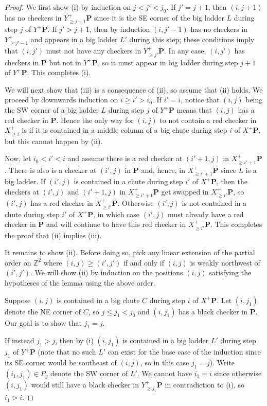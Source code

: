 \documentclass[11pt,reqno]{amsart} %
\newcommand{\bbZ}{\mathbb{Z}}
\newcommand{\bfP}{\mathbf{P}}
\theoremstyle{definition}
\begin{document}
\begin{proof}
We first show (i) by induction on $j< j'< j_0$.
If $j' = j+1$, then $(i,j+1)$ has no checkers in $Y^+_{\geq j+1} \bfP$ since it is the SE corner of the big ladder $L$ during step $j$ of $Y^+\bfP$.
If $j' > j+1$, then by induction $(i,j'-1)$ has no checkers in $Y^+_{\geq j'-1}$ and appears in a big ladder $L'$ during this step; these conditions imply that $(i,j')$ must not have any checkers in $Y^+_{\geq j'}\bfP$.
In any case, $(i,j')$ has checkers in $\bfP$ but not in $Y^+\bfP$, so it must appear in big ladder during step $j+1$ of $Y^+\bfP$.
This completes (i).

We will next show that (iii) is a consequence of (ii), so assume that (ii) holds.
We proceed by downwards induction on $i\geq i'> i_0$.
If $i' = i$, notice that $(i,j)$ being the SW corner of a big ladder $L$ during step $j$ of $Y^+\bfP$ means that $(i,j)$ has a red checker in $\bfP$.
Hence the only way for $(i,j)$ to not contain a red checker in $X^+_{\geq i}$ is if it is contained in a middle column of a big chute during step $i$ of $X^+\bfP$, but this cannot happen by (ii).

Now, let $i_0<i'<i$ and assume there is a red checker at $(i'+1,j)$ in $X^+_{\geq i'+1}\bfP$.
There is also is a checker at $(i',j)$ in $\bfP$ and, hence, in $X^+_{\geq i'+1}\bfP$ since $L$ is a big ladder.
If $(i',j)$ is contained in a chute during step $i'$ of $X^+\bfP$, then the checkers at $(i',j)$ and $(i'+1,j)$ in $X^+_{\geq i'+1}\bfP$ get swapped in $X^+_{\geq i'}\bfP$, so $(i',j)$ has a red checker in $X^+_{\geq i'}\bfP$.
Otherwise $(i',j)$ is not contained in a chute during step $i'$ of $X^+\bfP$, in which case $(i',j)$ must already have a red checker in $\bfP$ and will continue to have this red checker in $X^+_{\geq i'}\bfP$.
This completes the proof that (ii) implies (iii).

It remains to show (ii).
Before doing so, pick any linear extension of the partial order on $\bbZ^2$ where $(i,j)\geq (i',j')$ if and only if $(i,j)$ is weakly northwest of $(i',j')$.
We will show (ii) by induction on the positions $(i,j)$ satisfying the hypotheses of the lemma using the above order.

Suppose $(i,j)$ is contained in a big chute $C$ during step $i$ of $X^+\bfP$.
Let $(i,j_1)$ denote the NE corner of $C$, so $j\leq j_1< j_0$ and $(i,j_1)$ has a black checker in $\bfP$.
Our goal is to show that $j_1=j$.

If instead $j_1> j$, then by (i) $(i,j_1)$ is contained in a big ladder $L'$ during step $j_1$ of $Y^+\bfP$ (note that no such $L'$ can exist for the base case of the induction since its SE corner would be southeast of $(i,j)$, so in this case $j_1 = j$).
Write $(i_1,j_1)\in P_y$ denote the SW corner of $L'$.
We cannot have $i_1 = i$ since otherwise $(i,j_1)$ would still have a black checker in $Y^+_{\geq j_1}\bfP$ in contradiction to (i), so $i_1 > i$.


\end{proof}
\end{document}
